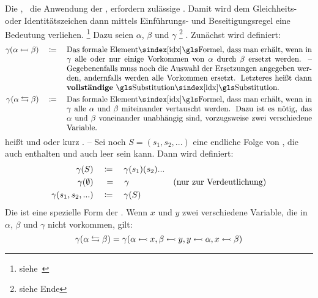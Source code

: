 {Die , \textdh\ die Anwendung der , erfordern zulässige .
Damit wird dem Gleichheits- oder Identitätszeichen \chrqt{$\eq$} dann mittels Einführungs- und Beseitigungsregel eine Bedeutung verliehen.%
\footnote{siehe~\cite{bib:NatuerlichesSchliessen}}
Dazu seien $\alpha$, $\beta$ und $\gamma$ %
\footnote{siehe Ende }
.
Zunächst wird definiert:
\begin{align}
	\gamma(\alpha \subst \beta) \quad \defeq \quad
	\parbox[t]{11cm}{%
		Das \glsIdxBg{Formel}{formale Element}, dass man erhält, wenn in $\gamma$ alle oder nur einige Vorkommen von $\alpha$ durch $\beta$ ersetzt werden.
		-- Gegebenenfalls muss noch die Auswahl der Ersetzungen angegeben werden, andernfalls werden alle Vorkommen ersetzt.
		Letzteres heißt dann \defn{vollständige} \glsIdx{Substitution}.
	} \label{def:Substitution}\\
	\gamma(\alpha \swap \beta) \quad \defeq \quad
	\parbox[t]{11cm}{%
		Das \glsIdxBg{Formel}{formale Element}, dass man erhält, wenn in $\gamma$ alle $\alpha$ und $\beta$ miteinander vertauscht werden.
		Dazu ist es nötig, das $\alpha$ und $\beta$ voneinander unabhängig sind, vorzugsweise zwei verschiedene Variable.
	} \label{def:Vertauschung}
\end{align}
\seqqt{$ \alpha \subst \beta $} heißt  und \seqqt{$ \alpha \swap \beta $}  oder kurz .
-- Sei noch $S = (s_1, s_2, ...)$ eine endliche Folge von , die auch  enthalten und auch leer sein kann. Dann wird definiert:
\begin{align}
	\gamma(S) & \quad \coloneqq \quad \gamma(s_1)(s_2)... \label{def:Substitutionen}\\
	\gamma(\emptyset) & \quad \; = \quad \gamma & \text{(nur zur Verdeutlichung)}\\
	\gamma(s_1,s_2,...) & \quad \coloneqq \quad \gamma(S)
\end{align}
%
Die  ist eine spezielle Form der .
Wenn $x$ und $y$ zwei verschiedene Variable, die in $\alpha$, $\beta$ und $\gamma$ nicht vorkommen, gilt:
\[
	\gamma(\alpha \leftrightarrows \beta) = \gamma(\alpha\leftarrowtail x, \beta\leftarrowtail y,  y\leftarrowtail\alpha, x \leftarrowtail\beta)
\]

}
